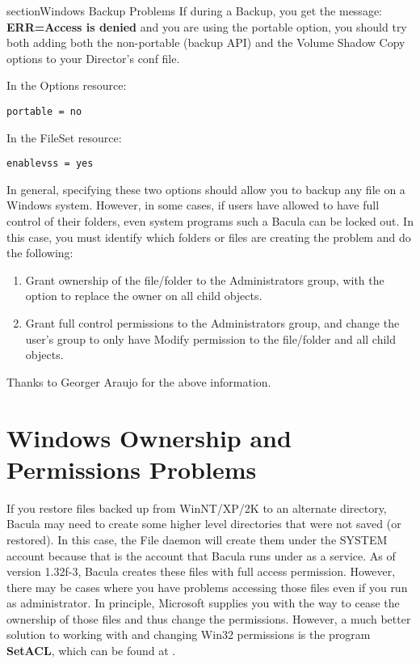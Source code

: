 section{Windows Backup Problems}
If during a Backup, you get the message: 
{\bf ERR=Access is denied} and you are using the portable option,
you should try both adding both the non-portable (backup API) and
the Volume Shadow Copy options to your Director's conf file.

In the Options resource:
\footnotesize
\begin{verbatim}
portable = no
\end{verbatim}
\normalsize

In the FileSet resource:
\footnotesize
\begin{verbatim}
enablevss = yes
\end{verbatim}
\normalsize

In general, specifying these two options should allow you to backup
any file on a Windows system.  However, in some cases, if users
have allowed to have full control of their folders, even system programs
such a Bacula can be locked out.  In this case, you must identify
which folders or files are creating the problem and do the following:

\begin{enumerate}
\item Grant ownership of the file/folder to the Administrators group,
with the option to replace the owner on all child objects.
\item Grant full control permissions to the Administrators group,
and change the user's group to only have Modify permission to
the file/folder and all child objects.
\end{enumerate}

Thanks to Georger Araujo for the above information.

\section{Windows Ownership and Permissions Problems}

If you restore files backed up from WinNT/XP/2K to an alternate directory,
Bacula may need to create some higher level directories that were not saved
(or restored). In this case, the File daemon will create them under the SYSTEM
account because that is the account that Bacula runs under as a service. As of
version 1.32f-3, Bacula creates these files with full access permission.
However, there may be cases where you have problems accessing those files even
if you run as administrator. In principle, Microsoft supplies you with the way
to cease the ownership of those files and thus change the permissions.
However, a much better solution to working with and changing Win32 permissions
is the program {\bf SetACL}, which can be found at 
. 

